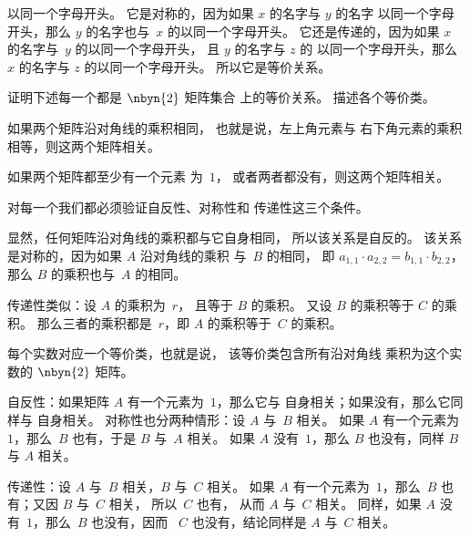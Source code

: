 \begin{exercises}
\begin{answer}
\begin{exparts}
        以同一个字母开头。
        它是对称的，因为如果 $x$ 的名字与 $y$ 的名字
        以同一个字母开头，那么 $y$ 的名字也与~$x$ 的以同一个字母开头。
        它还是传递的，因为如果 $x$ 的名字与~$y$ 的以同一个字母开头，
        且 $y$ 的名字与 $z$ 的
        以同一个字母开头，那么 $x$ 的名字与 $z$ 的以同一个字母开头。
        所以它是等价关系。
    \end{exparts}
  \end{answer}
  \item
  证明下述每一个都是 $\nbyn{2}$ 矩阵集合
  上的等价关系。
  描述各个等价类。
  \begin{exparts}
    \item 如果两个矩阵沿对角线的乘积相同，
      也就是说，左上角元素与
      右下角元素的乘积相等，则这两个矩阵相关。
    \item 如果两个矩阵都至少有一个元素
      为~$1$，
      或者两者都没有，则这两个矩阵相关。
  \end{exparts}
  \begin{answer}
    对每一个我们都必须验证自反性、对称性和
    传递性这三个条件。
    \begin{exparts}
      \item 显然，任何矩阵沿对角线的乘积都与它自身相同，
        所以该关系是自反的。
        该关系是对称的，因为如果 $A$ 沿对角线的乘积
        与~$B$ 的相同，
        即 $a_{1,1}\cdot a_{2,2}=b_{1,1}\cdot b_{2,2}$，
        那么 $B$ 的乘积也与~$A$ 的相同。
 
        传递性类似：设 $A$ 的乘积为~$r$，
        且等于 $B$ 的乘积。
        又设 $B$ 的乘积等于 $C$ 的乘积。
        那么三者的乘积都是~$r$，即 $A$ 的乘积等于~$C$ 的乘积。

        每个实数对应一个等价类，也就是说，
        该等价类包含所有沿对角线
        乘积为这个实数的 $\nbyn{2}$ 矩阵。
      \item 自反性：如果矩阵 $A$ 有一个元素为~$1$，那么它与
        自身相关；如果没有，那么它同样与
        自身相关。
        对称性也分两种情形：设 $A$ 与~$B$ 相关。
        如果 $A$ 有一个元素为~$1$，那么~$B$ 也有，于是 $B$ 与~$A$ 相关。
        如果 $A$ 没有~$1$，那么 $B$ 也没有，同样 $B$ 与
        $A$ 相关。
 
        传递性：设 $A$ 与~$B$ 相关，$B$ 与~$C$ 相关。
        如果 $A$ 有一个元素为~$1$，那么~$B$ 也有；又因 $B$ 与~$C$ 相关，
        所以~$C$ 也有，
        从而 $A$ 与~$C$ 相关。
        同样，如果 $A$ 没有~$1$，那么~$B$ 也没有，因而
        ~$C$ 也没有，结论同样是 $A$ 与~$C$ 相关。 


\end{exparts}
\end{answer}
\end{exercises}
